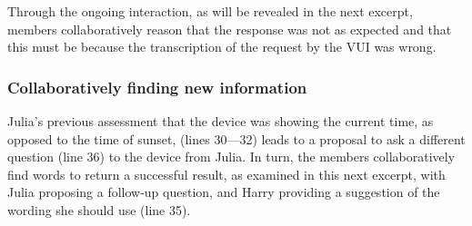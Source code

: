 \begin{revisedsubmission}
Through the ongoing interaction, as will be revealed in the next excerpt, members collaboratively reason that the response was not as expected and that this must be because the transcription of the request by the \ac{VUI} was wrong.
\end{revisedsubmission}






\subsubsection{Collaboratively finding new information}\label{sec:empirical cafe findings newinfo collab}
\begin{revisedsubmission}
Julia's previous assessment that the device was showing the current time, as opposed to the time of sunset, (lines 30---32)  leads to a proposal to ask a different question (line 36) to the device from Julia.
In turn, the members collaboratively find words to return a successful result, as examined in this next excerpt, with Julia proposing a follow-up question, and Harry providing a suggestion of the wording she should use (line 35).


\end{revisedsubmission}

